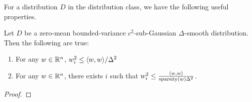 For a distribution $D$ in the distribution class, we have the following useful
properties. 
\begin{lemma} Let $D$ be a zero-mean bounded-variance $c^2$-sub-Gaussian
$\Delta$-smooth distribution. Then the following are true:
\begin{enumerate}
\item For any $w \in \mathbb{R}^n$, $w^2_i \leq \langle w, w \rangle/\Delta^2$
\item For any $w \in \mathbb{R}^n$, there exists $i$ such that $w^2_i \leq
\frac{\langle w, w \rangle}{\mathrm{sparsity}(w)\Delta^2}$.
\end{enumerate}
\end{lemma}
\begin{proof}

\end{proof}
